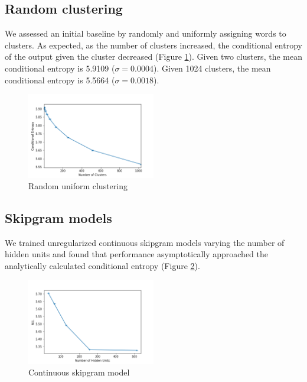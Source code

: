 \documentclass[11pt,letterpaper]{article}
\begin{document}
\subsection{Random clustering}

We assessed an initial baseline by randomly and uniformly assigning words to clusters. As expected, as the number of clusters increased, the conditional entropy of the output given the cluster decreased (Figure \ref{f:random}). Given two clusters, the mean conditional entropy is 5.9109 ($\sigma=0.0004$). Given 1024 clusters, the mean conditional entropy is 5.5664 ($\sigma=0.0018$).

\begin{figure}
  \caption{Random uniform clustering}
\label{f:random}
  \centering
    \includegraphics[width=0.5\textwidth]{random.png}
\end{figure}

\subsection{Skipgram models}

We trained unregularized continuous skipgram models varying the number of hidden units and found that performance asymptotically approached the analytically calculated conditional entropy (Figure \ref{f:baseline}). 

\begin{figure}
  \caption{Continuous skipgram model}
\label{f:baseline}
  \centering
    \includegraphics[width=0.5\textwidth]{baseline.png}
\end{figure}
\end{document}
